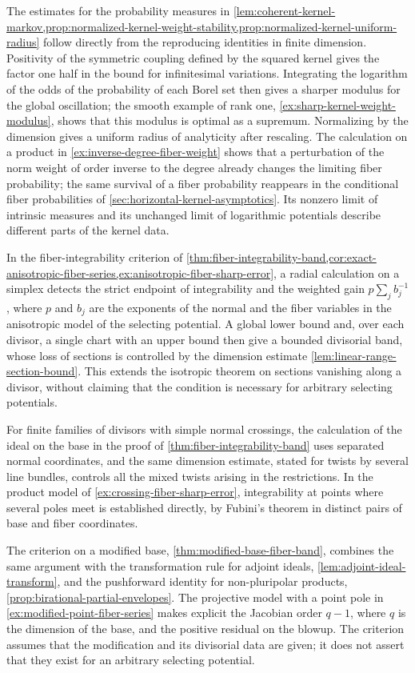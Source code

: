 The estimates for the probability measures in \cref{lem:coherent-kernel-markov,prop:normalized-kernel-weight-stability,prop:normalized-kernel-uniform-radius} follow directly from the reproducing identities in finite dimension. Positivity of the symmetric coupling defined by the squared kernel gives the factor one half in the bound for infinitesimal variations. Integrating the logarithm of the odds of the probability of each Borel set then gives a sharper modulus for the global oscillation; the smooth example of rank one, \cref{ex:sharp-kernel-weight-modulus}, shows that this modulus is optimal as a supremum. Normalizing by the dimension gives a uniform radius of analyticity after rescaling. The calculation on a product in \cref{ex:inverse-degree-fiber-weight} shows that a perturbation of the norm weight of order inverse to the degree already changes the limiting fiber probability; the same survival of a fiber probability reappears in the conditional fiber probabilities of \cref{sec:horizontal-kernel-asymptotics}. Its nonzero limit of intrinsic measures and its unchanged limit of logarithmic potentials describe different parts of the kernel data.

In the fiber-integrability criterion of \cref{thm:fiber-integrability-band,cor:exact-anisotropic-fiber-series,ex:anisotropic-fiber-sharp-error}, a radial calculation on a simplex detects the strict endpoint of integrability and the weighted gain $p\sum_jb_j^{-1}$, where $p$ and $b_j$ are the exponents of the normal and the fiber variables in the anisotropic model of the selecting potential. A global lower bound and, over each divisor, a single chart with an upper bound then give a bounded divisorial band, whose loss of sections is controlled by the dimension estimate \cref{lem:linear-range-section-bound}. This extends the isotropic theorem on sections vanishing along a divisor, without claiming that the condition is necessary for arbitrary selecting potentials.

For finite families of divisors with simple normal crossings, the calculation of the ideal on the base in the proof of \cref{thm:fiber-integrability-band} uses separated normal coordinates, and the same dimension estimate, stated for twists by several line bundles, controls all the mixed twists arising in the restrictions. In the product model of \cref{ex:crossing-fiber-sharp-error}, integrability at points where several poles meet is established directly, by Fubini's theorem in distinct pairs of base and fiber coordinates.

The criterion on a modified base, \cref{thm:modified-base-fiber-band}, combines the same argument with the transformation rule for adjoint ideals, \cref{lem:adjoint-ideal-transform}, and the pushforward identity for non-pluripolar products, \cref{prop:birational-partial-envelopes}. The projective model with a point pole in \cref{ex:modified-point-fiber-series} makes explicit the Jacobian order $q-1$, where $q$ is the dimension of the base, and the positive residual on the blowup. The criterion assumes that the modification and its divisorial data are given; it does not assert that they exist for an arbitrary selecting potential.

